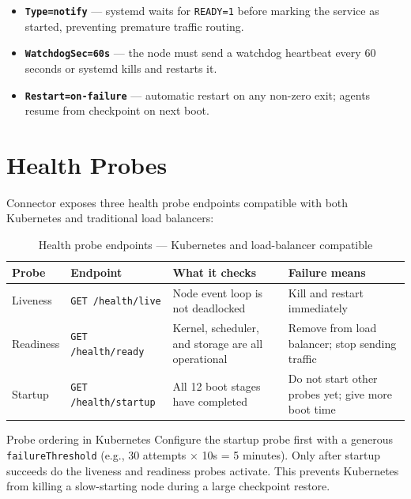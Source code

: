 \begin{itemize}[leftmargin=1.5em, itemsep=2pt]
  \item \textbf{\texttt{Type=notify}} — systemd waits for \texttt{READY=1}
        before marking the service as started, preventing premature traffic
        routing.
  \item \textbf{\texttt{WatchdogSec=60s}} — the node must send a watchdog
        heartbeat every 60 seconds or systemd kills and restarts it.
  \item \textbf{\texttt{Restart=on-failure}} — automatic restart on any
        non-zero exit; agents resume from checkpoint on next boot.
\end{itemize}

\section{Health Probes}

Connector exposes three health probe endpoints compatible with both Kubernetes
and traditional load balancers:

\begin{table}[H]
\centering
\renewcommand{\arraystretch}{1.45}
\begin{tabularx}{\textwidth}{@{}llXl@{}}
\toprule
\textbf{Probe} & \textbf{Endpoint} & \textbf{What it checks} & \textbf{Failure means} \\
\midrule
Liveness  & \texttt{GET /health/live}    &
  Node event loop is not deadlocked &
  Kill and restart immediately \\
Readiness & \texttt{GET /health/ready}   &
  Kernel, scheduler, and storage are all operational &
  Remove from load balancer; stop sending traffic \\
Startup   & \texttt{GET /health/startup} &
  All 12 boot stages have completed &
  Do not start other probes yet; give more boot time \\
\bottomrule
\end{tabularx}
\caption{Health probe endpoints — Kubernetes and load-balancer compatible}
\end{table}

\begin{insightbox}{Probe ordering in Kubernetes}
Configure the startup probe first with a generous \texttt{failureThreshold}
(e.g., 30 attempts × 10s = 5 minutes). Only after startup succeeds do the
liveness and readiness probes activate. This prevents Kubernetes from killing
a slow-starting node during a large checkpoint restore.
\end{insightbox}

